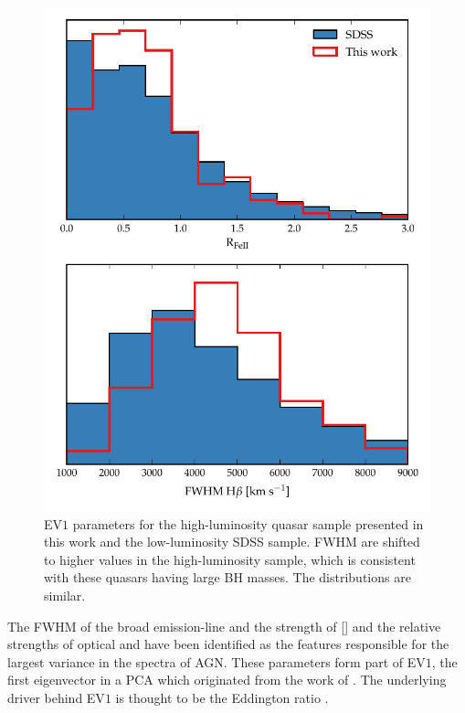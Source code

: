 \begin{figure}[t!]
\centering 
    \includegraphics[width=\columnwidth]{figures/chapter04/ev1_hists.pdf} 
    \caption[{}]{EV$1$ parameters for the high-luminosity quasar sample presented in this work and the low-luminosity SDSS sample. \hb FWHM are shifted to higher values in the high-luminosity sample, which is consistent with these quasars having large BH masses. The  distributions are similar.}      
    \label{fig:ev1_hists}
\end{figure}

The FWHM of the broad \hb emission-line and the strength of [] and the relative strengths of optical  and \hb have been identified as the features responsible for the largest variance in the spectra of AGN.
These parameters form part of EV$1$, the first eigenvector in a PCA which originated from the work of \citet{boroson92}.   
The underlying driver behind EV$1$ is thought to be the Eddington ratio \citep[e.g.][]{sulentic00b,shen14}.

